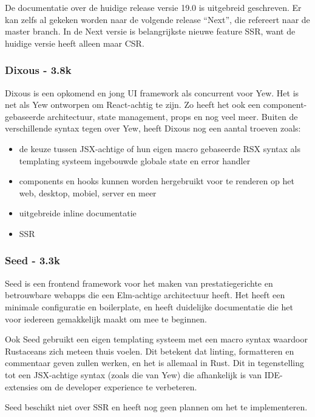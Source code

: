 De documentatie over de huidige release versie 19.0 is uitgebreid geschreven.  Er kan zelfs al
gekeken worden naar de volgende release “Next”, die refereert naar de master branch. In de Next
versie is belangrijkste nieuwe feature SSR, want de huidige versie heeft alleen maar CSR.

\subsubsection{Dixous - 3.8k}

Dixous is een opkomend en jong UI framework als concurrent voor Yew. Het is net als Yew ontworpen om
React-achtig te zijn. Zo heeft het ook een component-gebaseerde architectuur, state management,
props en nog veel meer. Buiten de verschillende syntax tegen over Yew, heeft Dixous nog een aantal
troeven zoals:  
\begin{itemize}
  \item de keuze tussen JSX-achtige of hun eigen macro gebaseerde RSX syntax als templating systeem
    ingebouwde globale state en error handler 

  \item components en hooks kunnen worden hergebruikt voor te renderen op het web, desktop, mobiel,
    server en meer 

  \item uitgebreide inline documentatie 

  \item SSR 
\end{itemize}

\subsubsection{Seed - 3.3k}

Seed is een frontend framework voor het maken van prestatiegerichte en betrouwbare webapps die een
Elm-achtige architectuur heeft. Het heeft een minimale configuratie en boilerplate, en heeft
duidelijke documentatie die het voor iedereen gemakkelijk maakt om mee te beginnen.  

Ook Seed gebruikt een eigen templating systeem met een macro syntax waardoor Rustaceans zich meteen
thuis voelen. Dit betekent dat linting, formatteren en commentaar geven zullen werken, en het is
allemaal in Rust. Dit in tegenstelling tot een JSX-achtige syntax (zoals die van Yew) die
afhankelijk is van IDE-extensies om de developer experience te verbeteren. 

Seed beschikt niet over SSR en heeft nog geen plannen om het te implementeren. 

